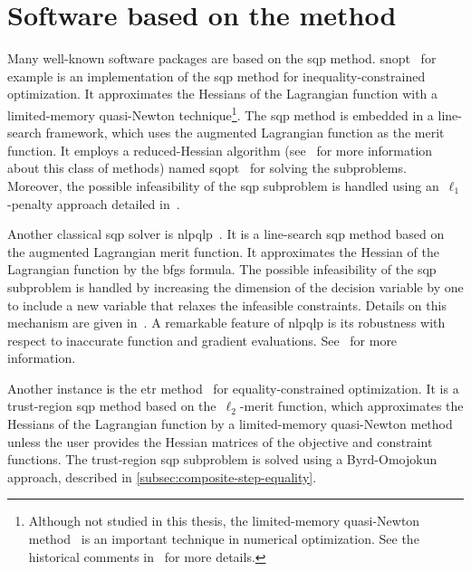 \section{Software based on the  method}
\label{sec:existing-sqp-software}

Many well-known software packages are based on the \gls{sqp} method.
\Gls{snopt}~\cite{Gill_Murray_Saunders_2002,Gill_Murray_Saunders_2005} for example is an implementation of the \gls{sqp} method for inequality-constrained optimization.
It approximates the Hessians of the Lagrangian function with a limited-memory quasi-Newton technique\footnote{Although not studied in this thesis, the limited-memory quasi-Newton method~\cite{Perry_1977,Shanno_1978} is an important technique in numerical optimization. See the historical comments in~\cite[\S~1, \P~3]{Liu_Nocedal_1989} for more details.}.
The \gls{sqp} method is embedded in a line-search framework, which uses the augmented Lagrangian function as the merit function.
It employs a reduced-Hessian algorithm (see~\cite{Byrd_Nocedal_1991} for more information about this class of methods) named \gls{sqopt}~\cite{Gill_Murray_Saunders_2008} for solving the subproblems.
Moreover, the possible infeasibility of the \gls{sqp} subproblem is handled using an~$\ell_1$-penalty approach detailed in~\cite[\S~1.2]{Gill_Murray_Saunders_2005}.

Another classical \gls{sqp} solver is \gls{nlpqlp}~\cite{Schittkowski_2015}.
It is a line-search \gls{sqp} method based on the augmented Lagrangian merit function.
It approximates the Hessian of the Lagrangian function by the \gls{bfgs} formula.
The possible infeasibility of the \gls{sqp} subproblem is handled by increasing the dimension of the decision variable by one to include a new variable that relaxes the infeasible constraints.
Details on this mechanism are given in~\cite[Eq.~(9)]{Schittkowski_1986}.
A remarkable feature of \gls{nlpqlp} is its robustness with respect to inaccurate function and gradient evaluations.
See~\cite{Schittkowski_2015} for more information.

Another instance is the \gls{etr} method~\cite{Lalee_Nocedal_Plantenga_1998} for equality-constrained optimization.
It is a trust-region \gls{sqp} method based on the~$\ell_2$-merit function, which approximates the Hessians of the Lagrangian function by a limited-memory quasi-Newton method unless the user provides the Hessian matrices of the objective and constraint functions.
The trust-region \gls{sqp} subproblem is solved using a Byrd-Omojokun approach, described in \cref{subsec:composite-step-equality}.

